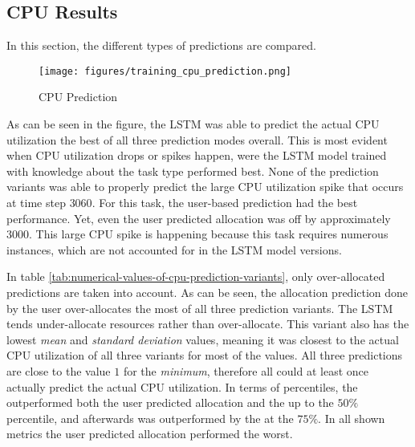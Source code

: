 \documentclass{article}
\begin{document}
  \subsection{CPU Results}
  \label{sec:cpu-results}


    In this section, the different types of predictions are compared.
    
    \begin{figure}[h!]
      \centering
      \texttt{[image: figures/training\_cpu\_prediction.png]}
      \caption{CPU Prediction}
      \label{fig:cpu-prediction}
    \end{figure}
    As can be seen in the figure, the LSTM  was able to predict the actual CPU utilization the best of all three prediction modes overall.
    This is most evident when CPU utilization drops or spikes happen, were the LSTM model trained with knowledge about the task type performed best.
    None of the prediction variants was able to properly predict the large CPU utilization spike that occurs at time step $3060$. For this task, the user-based prediction had the best performance. Yet, even the user predicted allocation was off by approximately 3000. This large CPU spike is happening because this task requires numerous instances, which are not accounted for in the LSTM model versions.

    In table \ref{tab:numerical-values-of-cpu-prediction-variants}, only over-allocated predictions are taken into account.
    As can be seen, the allocation prediction done by the user over-allocates the most of all three prediction variants.
    The LSTM  tends under-allocate resources rather than over-allocate. This variant also has the lowest \emph{mean} and \emph{standard deviation} values, meaning it was closest to the actual CPU utilization of all three variants for most of the values.
    All three predictions are close to the value $1$ for the \emph{minimum}, therefore all could at least once actually predict the actual CPU utilization.
    In terms of percentiles, the  outperformed both the user predicted allocation and the  up to the $50\%$ percentile, and afterwards was outperformed by the  at the $75\%$.
    In all shown metrics the user predicted allocation performed the worst.
    
\end{document}
